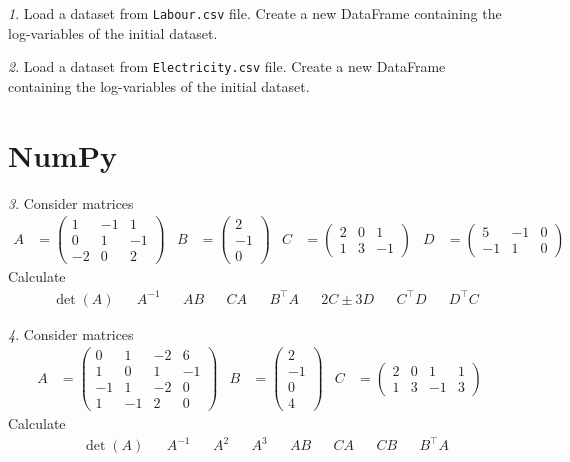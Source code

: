 \documentclass[12pt]{article}
\theoremstyle{remark}
\newtheorem{problem}{}[section]
\begin{document}
\begin{problem}
Load a dataset from \texttt{Labour.csv} file. Create a new DataFrame
containing the log-variables of the initial dataset.
\end{problem}

\begin{problem}
Load a dataset from \texttt{Electricity.csv} file. Create a new DataFrame
containing the log-variables of the initial dataset.
\end{problem}

\section{NumPy}

\begin{problem}
Consider matrices
\begin{align*}
	A&=\begin{pmatrix}
		1 & -1 & 1 \\ 0 & 1 & -1 \\ -2 & 0 & 2
	\end{pmatrix} &
	B &= \begin{pmatrix}
		2 \\ -1 \\ 0
	\end{pmatrix} &
	C &= \begin{pmatrix}
		2 & 0 & 1 \\ 1 & 3 & -1
	\end{pmatrix} &
	D&= \begin{pmatrix}
		5 & -1 & 0 \\ -1 & 1 & 0
	\end{pmatrix}
\end{align*}
Calculate
\begin{align*}
	&\det(A) & &A^{-1} & &AB & &CA & &B^\top A &
	&2C\pm 3D & &C^\top D & &D^\top C
\end{align*}
\end{problem}

\begin{problem}
Consider matrices
\begin{align*}
	A&=\begin{pmatrix}
		0 & 1 & -2 & 6 \\ 1 & 0 & 1 & -1 \\ 
		-1 & 1 & -2 & 0 \\ 1 & -1 & 2 & 0
	\end{pmatrix} &
	B &= \begin{pmatrix}
		2 \\ -1 \\ 0 \\ 4
	\end{pmatrix} &
	C &= \begin{pmatrix}
		2 & 0 & 1 & 1 \\ 1 & 3 & -1 & 3
	\end{pmatrix}
\end{align*}
Calculate
\begin{align*}
	&\det(A) & &A^{-1} & &A^2 & &A^3 & &AB & &CA & &CB & &B^\top A
\end{align*}
\end{problem}
\end{document}
